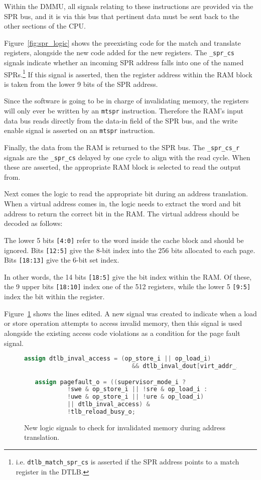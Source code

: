 Within the DMMU, all signals relating to these instructions are provided via the SPR bus, and it is via this bus that pertinent data must be sent back to the other sections of the CPU.

Figure~\ref{fig:spr_logic} shows the preexisting code for the match and translate registers, alongside the new code added for the new registers. The \verb|_spr_cs| signals indicate whether an incoming SPR address falls into one of the named SPRs.\footnote{i.e. \texttt{dtlb\_match\_spr\_cs} is asserted if the SPR address points to a match register in the DTLB.} If this signal is asserted, then the register address within the RAM block is taken from the lower 9 bits of the SPR address.

Since the software is going to be in charge of invalidating memory, the registers will only ever be written by an \texttt{mtspr} instruction. Therefore the RAM's input data bus reads directly from the data-in field of the SPR bus, and the write enable signal is asserted on an \texttt{mtspr} instruction.

Finally, the data from the RAM is returned to the SPR bus. The \verb|_spr_cs_r| signals are the \verb|_spr_cs| delayed by one cycle to align with the read cycle. When these are asserted, the appropriate RAM block is selected to read the output from.

Next comes the logic to read the appropriate bit during an address translation. When a virtual address comes in, the logic needs to extract the word and bit address to return the correct bit in the RAM. The virtual address should be decoded as follows:

The lower 5 bits \texttt{[4:0]} refer to the word inside the cache block and should be ignored. Bits \texttt{[12:5]} give the 8-bit index into the 256 bits allocated to each page. Bits \texttt{[18:13]} give the 6-bit set index.

In other words, the 14 bits \texttt{[18:5]} give the bit index within the RAM. Of these, the 9 upper bits \texttt{[18:10]} index one of the 512 registers, while the lower 5 \texttt{[9:5]} index the bit within the register.

Figure~\ref{fig:pgf_logic} shows the lines edited. A new signal was created to indicate when a load or store operation attempts to access invalid memory, then this signal is used alongside the existing access code violations as a condition for the page fault signal.

\begin{figure}[t]
  \centering
  \begin{lstlisting}[language=Verilog]
   assign dtlb_inval_access = (op_store_i || op_load_i)
                              && dtlb_inval_dout[virt_addr_i[9:5]];

   assign pagefault_o = ((supervisor_mode_i ?
			!swe & op_store_i || !sre & op_load_i :
			!uwe & op_store_i || !ure & op_load_i)
			|| dtlb_inval_access) &
			!tlb_reload_busy_o;
  \end{lstlisting}
  \caption{New logic signals to check for invalidated memory during address translation.}
  \label{fig:pgf_logic}
\end{figure}

